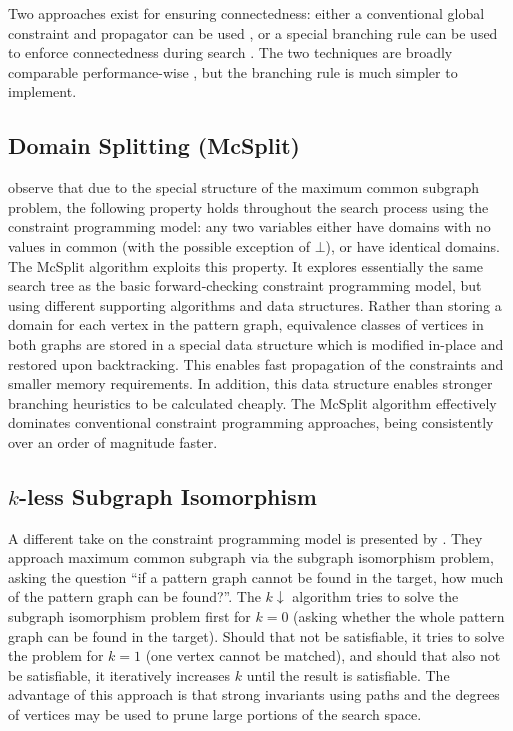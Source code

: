 \documentclass[sigconf]{acmart}
\begin{document}
Two approaches exist for ensuring connectedness: either a conventional global constraint and
propagator can be used \citep{DBLP:conf/cp/McCreeshNPS16}, or a special branching rule can be used
to enforce connectedness during search \citep{DBLP:conf/mco/VismaraV08}. The two techniques are
broadly comparable performance-wise \citep{DBLP:conf/cp/McCreeshNPS16}, but the branching rule is
much simpler to implement.

\subsection{Domain Splitting (McSplit)}

\citet{o:McCreeshPT17} observe that due to the special structure of the maximum common subgraph
problem, the following property holds throughout the search process using the constraint programming
model: any two variables either have domains with no values in common (with the possible exception
of $\bot$), or have identical domains. The McSplit algorithm exploits this property. It explores
essentially the same search tree as the basic forward-checking constraint programming model, but
using different supporting algorithms and data structures.  Rather than storing a domain for each
vertex in the pattern graph, equivalence classes of vertices in both graphs are stored in a special
data structure which is modified in-place and restored upon backtracking. This enables fast
propagation of the constraints and smaller memory requirements. In addition, this data structure
enables stronger branching heuristics to be calculated cheaply. The McSplit algorithm effectively
dominates conventional constraint programming approaches, being consistently over an order of
magnitude faster.

\subsection{$k$-less Subgraph Isomorphism}

A different take on the constraint programming model is presented by
\citet{DBLP:conf/aaai/HoffmannMR17}. They approach maximum common subgraph via the
subgraph isomorphism problem, asking the question ``if a pattern graph cannot be found in the
target, how much of the pattern graph can be found?''. The $k{\downarrow}$ algorithm tries to solve
the subgraph isomorphism problem first for $k=0$ (asking whether the whole pattern graph can be found in the
target). Should that not be satisfiable, it tries to solve the problem for $k=1$ (one vertex cannot
be matched), and should that also not be satisfiable, it iteratively increases $k$ until the result
is satisfiable. The advantage of this approach is that strong invariants using paths and the degrees
of vertices may be used to prune large portions of the search space.
\end{document}

